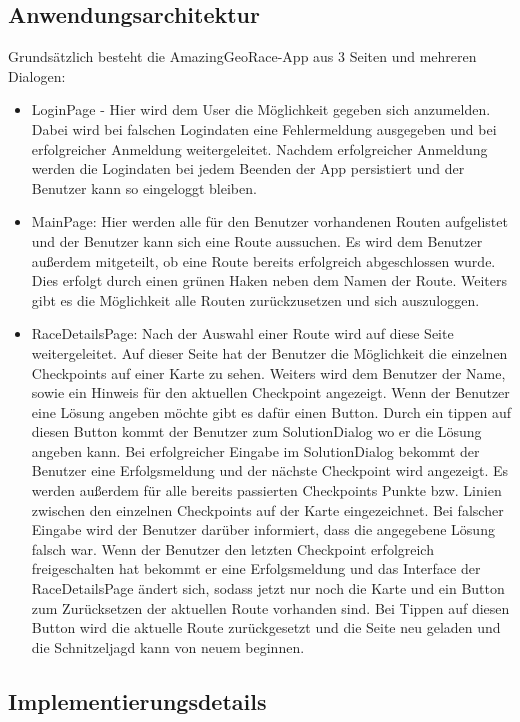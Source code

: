 \documentclass[a4paper,ngerman]{scrartcl}
\begin{document}
\subsection{Anwendungsarchitektur}
Grundsätzlich besteht die AmazingGeoRace-App aus 3 Seiten und mehreren Dialogen:
\begin{itemize}
	\item LoginPage - Hier wird dem User die Möglichkeit gegeben sich anzumelden. Dabei wird bei falschen Logindaten eine Fehlermeldung ausgegeben und bei erfolgreicher Anmeldung weitergeleitet. Nachdem erfolgreicher Anmeldung werden die Logindaten bei jedem Beenden der App persistiert und der Benutzer kann so eingeloggt bleiben. 
	\item MainPage: Hier werden alle für den Benutzer vorhandenen Routen aufgelistet und der Benutzer kann sich eine Route aussuchen. Es wird dem Benutzer außerdem mitgeteilt, ob eine Route bereits erfolgreich abgeschlossen wurde. Dies erfolgt durch einen grünen Haken neben dem Namen der Route. Weiters gibt es die Möglichkeit alle Routen zurückzusetzen und sich auszuloggen. 
	\item RaceDetailsPage: Nach der Auswahl einer Route wird auf diese Seite weitergeleitet. Auf dieser Seite hat der Benutzer die Möglichkeit die einzelnen Checkpoints auf einer Karte zu sehen. Weiters wird dem Benutzer der Name, sowie ein Hinweis für den aktuellen Checkpoint angezeigt. Wenn der Benutzer eine Lösung angeben möchte gibt es dafür einen Button. Durch ein tippen auf diesen Button kommt der Benutzer zum SolutionDialog wo er die Lösung angeben kann. Bei erfolgreicher Eingabe im SolutionDialog bekommt der Benutzer eine Erfolgsmeldung und der nächste Checkpoint wird angezeigt. Es werden außerdem für alle bereits passierten Checkpoints Punkte bzw. Linien zwischen den einzelnen Checkpoints auf der Karte eingezeichnet. Bei falscher Eingabe wird der Benutzer darüber informiert, dass die angegebene Lösung falsch war. Wenn der Benutzer den letzten Checkpoint erfolgreich freigeschalten hat bekommt er eine Erfolgsmeldung und das Interface der RaceDetailsPage ändert sich, sodass jetzt nur noch die Karte und ein Button zum Zurücksetzen der aktuellen Route vorhanden sind. Bei Tippen auf diesen Button wird die aktuelle Route zurückgesetzt und die Seite neu geladen und die Schnitzeljagd kann von neuem beginnen.
\end{itemize}

\subsection{Implementierungsdetails}
\end{document}
